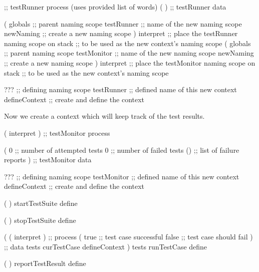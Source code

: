 \startJoylolCode

              ;; testRunner process (uses provided list of words)
( 
)             ;; testRunner data

(
  globals     ;; parent naming scope
  testRunner  ;; name of the new naming scope
  newNaming   ;; create a new naming scope
) interpret   ;; place the testRunner naming scope on stack
              ;; to be used as the new context's naming scope
(
  globals     ;; parent naming scope
  testMonitor ;; name of the new naming scope
  newNaming   ;; create a new naming scope
) interpret   ;; place the testMonitor naming scope on stack
              ;; to be used as the new context's naming scope

              
???           ;; defining naming scope
testRunner    ;; defined name of this new context
defineContext ;; create and define the context
\stopJoylolCode

Now we create a context which will keep track of the test results. 

\startJoylolCode
( interpret ) ;; testMonitor process

( 
  0           ;; number of attempted tests
  0           ;; number of failed tests
  ()          ;; list of failure reports
)             ;; testMonitor data


???           ;; defining naming scope
testMonitor   ;; defined name of this new context
defineContext ;; create and define the context
\stopJoylolCode



\stopTestSuite

\starttyping
{}

\startJoylolCode
  (
  )
  startTestSuite
  define
  
  (
  )
  stopTestSuite
  define
\stopJoylolCode

\stopTestSuite
\stoptyping


\startJoylolCode
(
  ( interpret ) ;; process
  (
    true ;; test case successful
    false ;; test case should fail
  ) ;; data
  tests
  curTestCase
  defineContext
)
tests
runTestCase
define
\stopJoylolCode

\stopTestSuite

\startTestSuite[reportTestResult]

\startJoylolCode
  (
  )
  reportTestResult
  define
\stopJoylolCode

\stopTestSuite

